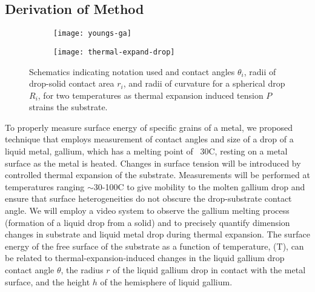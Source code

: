 
\subsection{Derivation of Method}


\begin{wrapfigure}[12]{r}{0.5\linewidth}
	\begin{subfigure}[b]{0.5\textwidth}
		\texttt{[image: youngs-ga]}
		\label{fig:youngs-ga}
	\end{subfigure}
	\begin{subfigure}[b]{0.5\textwidth}
		\texttt{[image: thermal-expand-drop]}
		\label{fig:thermal-expand-drop}
	\end{subfigure}
	\caption{Schematics indicating notation used and contact angles $\theta_{i}$, radii of drop-solid contact area $r_{i}$, and radii of curvature for a spherical drop $R_{i}$, for two temperatures as thermal expansion induced tension $P$ strains the substrate.}
	\label{fig:therm-exp-ga}
\end{wrapfigure}
To properly measure surface energy of specific grains of a metal, we proposed technique that employs measurement of contact angles and size of a drop of a liquid metal, gallium, which has a melting point of ~30\degree C, resting on a metal surface as the metal is heated. Changes in surface tension will be introduced by controlled thermal expansion of the substrate. Measurements will be performed at temperatures ranging $\sim$30-100\degree C to give mobility to the molten gallium drop and ensure that surface heterogeneities do not obscure the drop-substrate contact angle. We will employ a video system to observe the gallium melting process (formation of a liquid drop from a solid) and to precisely quantify dimension changes in substrate and liquid metal drop during thermal expansion. The surface energy of the free surface of the substrate as a function of temperature, \gamSV(T), can be related to thermal-expansion-induced changes in the liquid gallium drop contact angle $\theta$, the radius $r$ of the liquid gallium drop in contact with the metal surface, and the height $h$ of the hemisphere of liquid gallium. 

